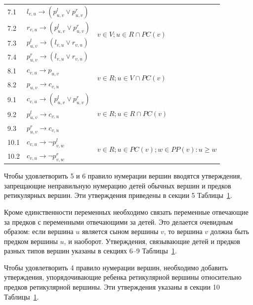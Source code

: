 \begin{table}[t]
\begin{tabular}{l | l | l}
  \hline
  7.1 &
  $l_{v,u} \rightarrow (p^l_{u,v} \vee p^r_{u,v})$ &
  \multirow{4}{*}{$v \in V; u \in R \cap PC(v)$}
  \\
  7.2 &
  $r_{v,u} \rightarrow (p^l_{u,v} \vee p^r_{u,v})$ &
  \\
  7.3 &
  $p^l_{u,v} \rightarrow (l_{v,u} \vee r_{v,u})$ &
  \\
  7.4 &
  $p^r_{u,v} \rightarrow (l_{v,u} \vee r_{v,u})$ &
  \\

  \hline 
  8.1 &
  $c_{v,u} \rightarrow p_{u,v}$ &
  \multirow{2}{*}{$v \in R; u \in V \cap PC(v)$}
  \\
  8.2 &
  $p_{u,v} \rightarrow c_{v,u}$ &
  \\

  \hline
  9.1 &
  $c_{v,u} \rightarrow (p^l_{u,v} \vee p^r_{u,v})$ &
  \multirow{3}{*}{$v \in R; u \in R \cap PC(v)$}
  \\
  9.2 &
  $p^l_{u,v} \rightarrow c_{v,u}$ &
  \\
  9.3 &
  $p^r_{u,v} \rightarrow c_{v,u}$ &
  \\

  \hline
  10.1\quad &
  $c_{v,u} \rightarrow \neg p^l_{v,w}$ &
  \multirow{2}{*}{$v \in R; u \in PC(v); w \in PP(v): u \geq w$}
  \\
  10.2 &
  $c_{v,u} \rightarrow \neg p^r_{v,w}$ &
  \\

\end{tabular}
\label{network-table}
\end{table}

Чтобы удовлетворить 5 и 6 правило нумерации вершин вводятся утверждения, запрещающие неправильную нумерацию детей обычных вершин и предков ретикулярных вершин.
Эти утверждения приведены в секции 5 Таблицы~\ref{network-table}.

Кроме единственности переменных необходимо связать переменные отвечающие за предков с переменными отвечающими за детей.
Это делается очевидным образом: если вершина $u$ является сыном вершины $v$, то вершина $v$ должна быть предком вершины $u$, и наоборот.
Утверждения, связывающие детей и предков разных типов вершин указаны в секциях 6--9 Таблицы~\ref{network-table}.

Чтобы удовлетворить 4 правило нумерации вершин, необходимо добавить утверждения, упорядочивающие ребенка ретикулярной вершины относительно предков ретикулярной вершины.
Эти утверждения указаны в секции 10 Таблицы~\ref{network-table}.

